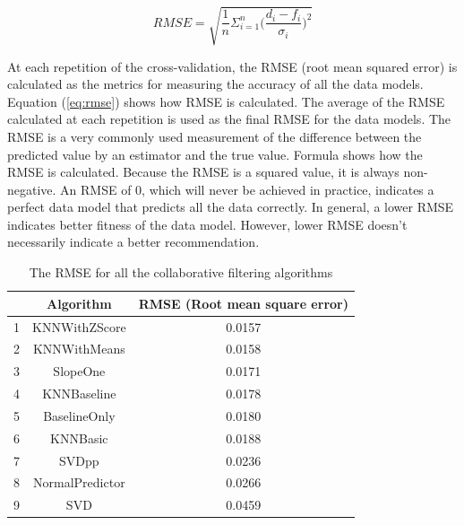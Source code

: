 \begin{equation}\label{eq:rmse}
   RMSE = \sqrt{\frac{1}{n}\Sigma_{i=1}^{n}{\Big(\frac{d_i -f_i}{\sigma_i}\Big)^2}}
\end{equation}

At each repetition of the cross-validation, the RMSE (root mean squared error) is calculated as the metrics for measuring the accuracy of all the data models. Equation (\ref{eq:rmse}) shows how RMSE is calculated. The average of the RMSE calculated at each repetition is used as the final RMSE for the data models. The RMSE is a very commonly used measurement of the difference between the predicted value by an estimator and the true value. Formula shows how the RMSE is calculated. Because the RMSE is a squared value, it is always non-negative. An RMSE of 0, which will never be achieved in practice, indicates a perfect data model that predicts all the data correctly. In general, a lower RMSE indicates better fitness of the data model. However, lower RMSE doesn't necessarily indicate a better recommendation.

\begin{table}[btp]
 \caption{\label{table:rmse_cf_algo} The RMSE for all the collaborative filtering algorithms}
 \begin{center}
  \begin{tabular}{ccc}
   \hline
   & Algorithm & RMSE (Root mean square error) \\
   \hline
   1 & KNNWithZScore & 0.0157 \\
   2 & KNNWithMeans & 0.0158 \\
   3 & SlopeOne & 0.0171 \\
   4 & KNNBaseline & 0.0178 \\
   5 & BaselineOnly & 0.0180 \\
   6 & KNNBasic & 0.0188 \\
   7 & SVDpp & 0.0236 \\
   8 & NormalPredictor & 0.0266 \\
   9 & SVD & 0.0459 \\
   \hline
  \end{tabular} 
 \end{center}
\end{table}

